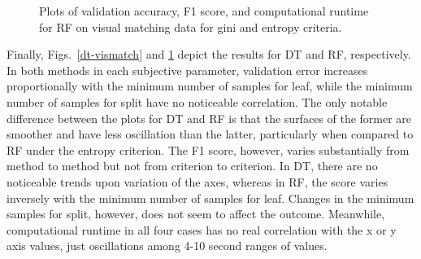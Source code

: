 \documentclass[12pt]{uthesis-v12}  %
\begin{document}
\begin{figure}
	\hfill	
{}
						
\caption{Plots of validation accuracy, F1 score, and computational runtime for RF on visual matching data for gini and entropy criteria.}
	\label{rfr-vismatch}
	\end{figure}	
	
Finally, Figs.~\ref{dt-vismatch} and \ref{rfr-vismatch} depict the results for DT and RF, respectively. In both methods in each subjective parameter, validation error increases proportionally with the minimum number of samples for leaf, while the minimum number of samples for split have no noticeable correlation. The only notable difference between the plots for DT and RF is that the surfaces of the former are smoother and have less oscillation than the latter, particularly when compared to RF under the entropy criterion. The F1 score, however, varies substantially from method to method but not from criterion to criterion. In DT, there are no noticeable trends upon variation of the axes, whereas in RF, the score varies inversely with the minimum number of samples for leaf. Changes in the minimum samples for split, however, does not seem to affect the outcome. Meanwhile, computational runtime in all four cases has no real correlation with the x or y axis values, just oscillations among 4-10 second ranges of values.
\end{document}
